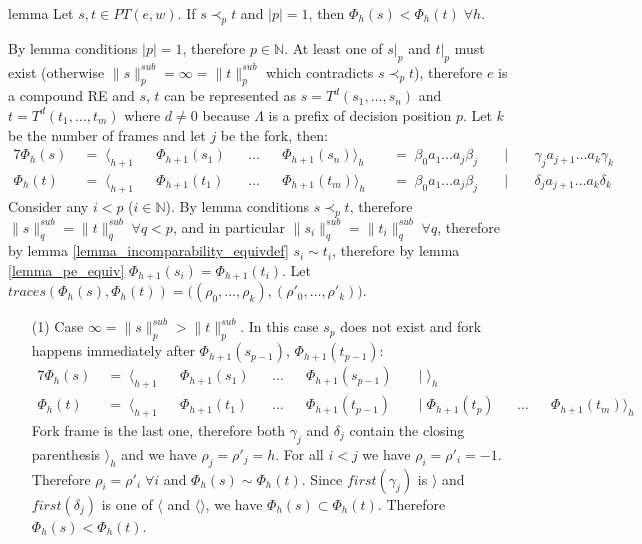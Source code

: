 \documentclass[AMA,STIX1COL]{WileyNJD-v2}
\newcommand{\Xl}{\langle}
\newcommand{\Xr}{\rangle}
\newcommand{\Xm}{\langle\!\rangle}
\newcommand{\YN}{\mathbb{N}}
\newcommand{\snorm}[2]{\|{#1}\|^{sub}_{#2}}
\begin{document}
\begin{theoremEnd}{lemma}
    \label{lemma_pe_less_1}
    Let $s, t \in PT(e, w)$.
    If $s \prec_p t$ and $|p| = 1$, then $\Phi_{h}(s) < \Phi_{h}(t) \; \forall h$.
\end{theoremEnd}
\begin{proofEnd}
    By lemma conditions $|p| = 1$, therefore $p \in \YN$.
    At least one of $s|_p$ and $t|_p$ must exist (otherwise $\snorm{s}{p} = \infty = \snorm{t}{p}$ which contradicts $s \prec_p t$),
    therefore $e$ is a compound RE and $s$, $t$ can be represented as
    $s = T^{d} (s_1, \dots, s_n)$ and
    $t = T^{d} (t_1, \dots, t_m)$
    where $d \neq 0$ because $\Lambda$ is a prefix of decision position $p$.
    Let $k$ be the number of frames and let $j$ be the fork, then:
    \begin{alignat*}{7}
        \Phi_{h}(s) &\;=\; \Xl_{h+1} &&\Phi_{h+1}(s_1) &&\dots &&\Phi_{h+1}(s_n) \Xr_h
            &&\;=\; \beta_0 a_1 \dots a_j \beta_j &&\;\big|\; && \gamma_j a_{j + 1} \dots a_k \gamma_k \\[-0.5em]
        \Phi_{h}(t) &\;=\; \Xl_{h+1} &&\Phi_{h+1}(t_1) &&\dots &&\Phi_{h+1}(t_m) \Xr_h
            &&\;=\; \beta_0 a_1 \dots a_j \beta_j &&\;\big|\; && \delta_j a_{j + 1} \dots a_k \delta_k
    \end{alignat*}
%
    Consider any $i < p$ ($i \in \YN$).
    By lemma conditions $s \prec_p t$, therefore $\snorm{s}{q} = \snorm{t}{q} \;\forall q < p$, and
    in particular $\snorm{s_i}{q} = \snorm{t_i}{q} \;\forall q$, therefore
    by lemma \ref{lemma_incomparability_equivdef} $s_i \sim t_i$,
    therefore by lemma \ref{lemma_pe_equiv} $\Phi_{h+1}(s_i) = \Phi_{h+1}(t_i)$.
    Let $traces (\Phi_{h}(s), \Phi_{h}(t)) = \big( (\rho_0, \dots, \rho_k), (\rho'_0, \dots, \rho'_k) \big)$.

    \begin{itemize}[itemsep=0.5em, topsep=0.5em]
    \item[(1)]
        Case $\infty = \snorm{s}{p} > \snorm{t}{p}$.
        In this case $s_p$ does not exist
        and fork happens immediately after $\Phi_{h+1}(s_{p-1})$, $\Phi_{h+1}(t_{p-1})$:
        \begin{alignat*}{7}
            \Phi_{h}(s) &\;=\; \Xl_{h+1} &&\Phi_{h+1}(s_1) &&\dots &&\Phi_{h+1}(s_{p-1})
                &&\;\big|\; \Xr_{h}         &&      && \\[-0.5em]
            \Phi_{h}(t) &\;=\; \Xl_{h+1} &&\Phi_{h+1}(t_1) &&\dots &&\Phi_{h+1}(t_{p-1})
                &&\;\big|\; \Phi_{h+1}(t_p) &&\dots &&\Phi_{h+1}(t_m) \Xr_{h}
        \end{alignat*}
        Fork frame is the last one,
        therefore both $\gamma_j$ and $\delta_j$ contain the closing parenthesis $\Xr_{h}$
        and we have $\rho_j = \rho'_j = h$.
        For all $i < j$ we have $\rho_i = \rho'_i = -1$.
        Therefore $\rho_i = \rho'_i \;\forall i$ and $\Phi_{h}(s) \sim \Phi_{h}(t)$.
        Since $first(\gamma_j)$ is $\Xr$ and $first(\delta_j)$ is one of $\Xl$ and $\Xm$,
        we have $\Phi_{h}(s) \subset \Phi_{h}(t)$.
        Therefore $\Phi_{h}(s) < \Phi_{h}(t)$.


\end{itemize}
\end{proofEnd}
\end{document}
